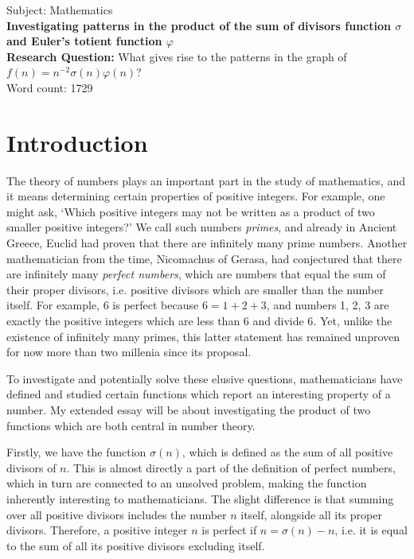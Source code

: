 \documentclass[a4paper, 12pt]{article}
\theoremstyle{definition}
\begin{document}
\begin{titlepage}
  \begin{center}
    Subject: Mathematics\\
    \vspace*{4cm}
    {\Large \textbf{Investigating patterns in the product of the sum of divisors function $\sigma$ and Euler's totient function $\varphi$}}\\

    \vspace{1cm}
    \textbf{Research Question:}
    What gives rise to the patterns in the graph of $f(n)=n^{-2}\sigma(n)\varphi(n)$?\\

    \vfill
    Word count: 1729
  \end{center}
\end{titlepage}

\tableofcontents

\newpage

\section{Introduction}
The theory of numbers plays an important part in the study of mathematics, and it means determining certain properties of positive integers.
For example, one might ask, `Which positive integers may not be written as a product of two smaller positive integers?'
We call such numbers \textit{primes}, and already in Ancient Greece, Euclid had proven that there are infinitely many prime numbers.
Another mathematician from the time, Nicomachus of Gerasa, had conjectured that there are infinitely many \textit{perfect numbers}, which are numbers that equal the sum of their proper divisors, i.e. positive divisors which are smaller than the number itself.
For example, 6 is perfect because $6=1+2+3$, and numbers 1, 2, 3 are exactly the positive integers which are less than 6 and divide 6.
Yet, unlike the existence of infinitely many primes, this latter statement has remained unproven for now more than two millenia since its proposal.

To investigate and potentially solve these elusive questions, mathematicians have defined and studied certain functions which report an interesting property of a number.
My extended essay will be about investigating the product of two functions which are both central in number theory.

Firstly, we have the function $\sigma(n)$, which is defined as the sum of all positive divisors of $n$.
This is almost directly a part of the definition of perfect numbers, which in turn are connected to an unsolved problem, making the function inherently interesting to mathematicians.
The slight difference is that summing over all positive divisors includes the number $n$ itself, alongside all its proper divisors.
Therefore, a positive integer $n$ is perfect if $n=\sigma(n)-n$, i.e. it is equal to the sum of all its positive divisors excluding itself.
\end{document}
